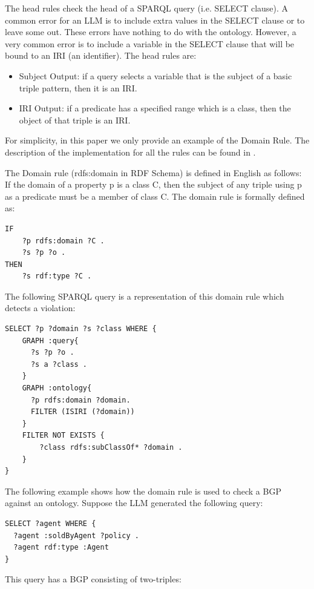 \documentclass[11pt]{article}
\begin{document}
The head rules check the head of a SPARQL query (i.e. SELECT clause). 
A common error for an LLM is to include extra values in the SELECT clause or to leave some out. 
These errors have nothing to do with the ontology. 
However, a very common error is to include a variable in the SELECT clause that will be bound to an IRI (an identifier).
The head rules are:
\begin{itemize}
    \item Subject Output: if a query selects a variable that is the subject of a basic triple pattern, then it is an IRI.
\item IRI Output: if a predicate has a specified range which is a class, then the object of that triple is an IRI.
\end{itemize}

For simplicity, in this paper we only provide an example of the Domain Rule. The description of the implementation for all the rules can be found in \cite{SecondContribution,DBLP:journals/corr/abs-2405-11706}.

The Domain rule (rdfs:domain in RDF Schema) is defined in English as follows: 
If the domain of a property p is a class C, then the subject of any triple using p as a predicate must be a member of class C.
The domain rule is formally defined as: 
\begin{verbatim}
IF 
    ?p rdfs:domain ?C . 
    ?s ?p ?o .  
THEN 
    ?s rdf:type ?C .
\end{verbatim}

The following SPARQL query is a representation of this domain rule which detects a violation: 
\begin{lstlisting}[language=SPARQL]
SELECT ?p ?domain ?s ?class WHERE {
    GRAPH :query{
      ?s ?p ?o .
      ?s a ?class .
    }
    GRAPH :ontology{
      ?p rdfs:domain ?domain.
      FILTER (ISIRI (?domain))
    }
    FILTER NOT EXISTS {
        ?class rdfs:subClassOf* ?domain .
    }
}
\end{lstlisting}


The following example shows how the domain rule is used to check a BGP against an ontology.
Suppose the LLM generated the following query: 

\begin{lstlisting}[language=SPARQL]
SELECT ?agent WHERE {
  ?agent :soldByAgent ?policy . 
  ?agent rdf:type :Agent 
}
\end{lstlisting}

This query has a BGP consisting of two-triples: 
\end{document}
